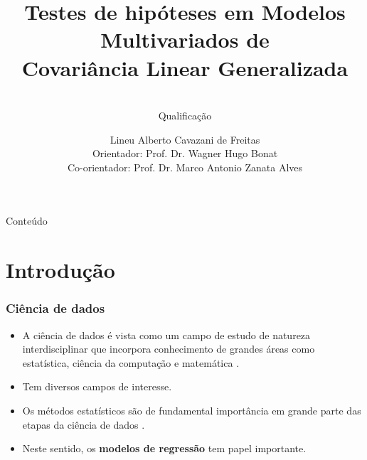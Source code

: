 \documentclass[10pt,
  aspectratio=169,
  serif,
  mathserif,
  professionalfont,
  compress,
  handout,
  ]{beamer}\usepackage[]{graphicx}\usepackage[]{color}
\title[TH MCGLM]{
  \Large Testes de hipóteses em Modelos Multivariados de \\ Covariância Linear Generalizada}
\subtitle{ \\ Qualificação}
\author[Lineu Alberto]{\small
  Lineu Alberto Cavazani de Freitas \\
  Orientador: Prof. Dr. Wagner Hugo Bonat\\
  Co-orientador: Prof. Dr. Marco Antonio Zanata Alves
}
\institute[UFPR]{
    PPG Informática %
% 
 }
\date{}
\begin{document}
\frame{\titlepage}

 \begin{frame}{Conteúdo}
   \small{\tableofcontents}
 \end{frame}





\section{Introdução}


\begin{frame}
  \frametitle{Ciência de dados}
  \begin{itemize}
    \itemsep 2ex
  
  \item A ciência de dados é vista como um campo de estudo de natureza interdisciplinar que incorpora conhecimento de grandes áreas como estatística, ciência da computação e matemática \cite{ley2018makes}. 
  
  \item Tem diversos campos de interesse.

  \item Os métodos estatísticos são de fundamental importância em grande parte das etapas da ciência de dados \cite{weihs2018data}.
  
  \item Neste sentido, os \textbf{modelos de regressão} tem papel importante.
  
  \end{itemize}
\end{frame}

\end{document}
